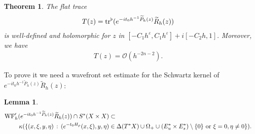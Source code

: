 \documentclass[reqno,12pt,letterpaper]{amsart}
\newtheorem{thm}{Theorem}
\newtheorem{lem}[prop]{Lemma}
\numberwithin{equation}{section}
\numberwithin{prop}{section}
\begin{document}

\begin{thm}
\label{traceest}
The flat trace
\begin{align*}
    T(z)={\rm tr}^\flat ( e^{-it_0h^{-1}\widetilde{P}_h(z)} \widetilde{R}_h(z))
\end{align*}
is well-defined and holomorphic for $z$ in $[-C_1h^\varepsilon,C_1h^\varepsilon]+i[-C_2h,1]$. Moreover, we have 
\begin{align}\label{crucial}
    T(z)=\mathcal{O}(h^{-2n-2}).
\end{align}
\end{thm}


To prove it we need a wavefront set estimate for the Schwartz kernel of $e^{-it_0h^{-1}\widetilde{P}_h(z)} \widetilde{R}_h(z)$:
\begin{lem}
\label{wf2}
\begin{align*}
{\rm WF}_h'(e^{-it_0h^{-1}\widetilde{P}_h(z)} \widetilde{R}_h(z))\cap S^*(X\times X)&\subset  \\
\kappa(\{(x,\xi,y,\eta)\,:\,(e^{-t_0H_p}(x,\xi),y,\eta)&\in \Delta(T^*X)\cup \Omega_+\cup(E^*_u\times E^*_s)\setminus\{0\} \text{ or } \xi=0,\eta\neq 0\}).
\end{align*}
\end{lem}
\end{document}
